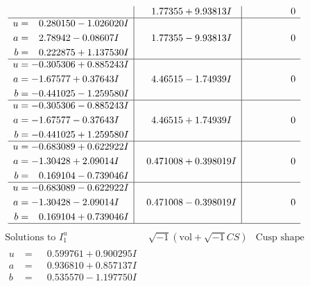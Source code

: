 \documentclass[1p]{elsarticle_modified}
\theoremstyle{definition}
\newcommand{\I}{\sqrt{-1}}
\begin{document}
$$\begin{array}{c|c|c}
 & \phantom{-}1.77355 + 9.93813 I & \phantom{-0.000000 } 0 \\ \hline\begin{aligned}
u &= \phantom{-}0.280150 - 1.026020 I \\
a &= \phantom{-}2.78942 - 0.08607 I \\
b &= \phantom{-}0.222875 + 1.137530 I\end{aligned}
 & \phantom{-}1.77355 - 9.93813 I & \phantom{-0.000000 } 0 \\ \hline\begin{aligned}
u &= -0.305306 + 0.885243 I \\
a &= -1.67577 + 0.37643 I \\
b &= -0.441025 - 1.259580 I\end{aligned}
 & \phantom{-}4.46515 - 1.74939 I & \phantom{-0.000000 } 0 \\ \hline\begin{aligned}
u &= -0.305306 - 0.885243 I \\
a &= -1.67577 - 0.37643 I \\
b &= -0.441025 + 1.259580 I\end{aligned}
 & \phantom{-}4.46515 + 1.74939 I & \phantom{-0.000000 } 0 \\ \hline\begin{aligned}
u &= -0.683089 + 0.622922 I \\
a &= -1.30428 + 2.09014 I \\
b &= \phantom{-}0.169104 - 0.739046 I\end{aligned}
 & \phantom{-}0.471008 + 0.398019 I & \phantom{-0.000000 } 0 \\ \hline\begin{aligned}
u &= -0.683089 - 0.622922 I \\
a &= -1.30428 - 2.09014 I \\
b &= \phantom{-}0.169104 + 0.739046 I\end{aligned}
 & \phantom{-}0.471008 - 0.398019 I & \phantom{-0.000000 } 0\\
 \hline 
 \end{array}$$\newpage$$\begin{array}{c|c|c}  
\text{Solutions to }I^u_{1}& \I (\text{vol} + \sqrt{-1}CS) & \text{Cusp shape}\\
 \hline 
\begin{aligned}
u &= \phantom{-}0.599761 + 0.900295 I \\
a &= \phantom{-}0.936810 + 0.857137 I \\
b &= \phantom{-}0.535570 - 1.197750 I\end{aligned}

\end{array}$$
\end{document}
